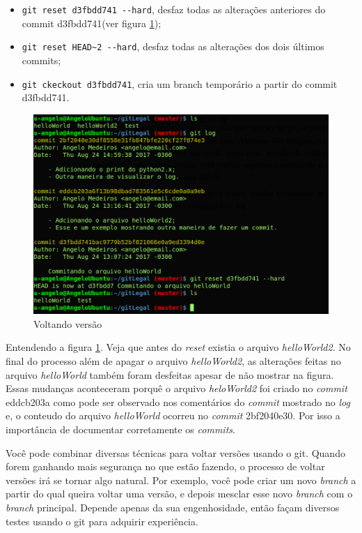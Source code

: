 \documentclass[12pt,openright,oneside,a4paper,english,brazil]{abntex2}
\begin{document}
\begin{itemize}
	\item \verb|git reset d3fbdd741 --hard|, desfaz todas as alterações anteriores do commit d3fbdd741(ver figura \ref{voltando});
	\item \verb|git reset HEAD~2 --hard|, desfaz todas as alterações dos dois últimos commits;
	\item \verb|git ckeckout d3fbdd741|, cria um branch temporário a partir do commit d3fbdd741.
\end{itemize}

\begin{figure}[h]
	\caption{\label{voltando}Voltando versão}
	\begin{center}
		\includegraphics[width=1\linewidth]{imagens/voltando}
	\end{center}
\end{figure}

Entendendo a figura \ref{voltando}. Veja que antes do \textit{reset} existia o arquivo \textit{helloWorld2}. No final do processo além de apagar o arquivo \textit{helloWorld2}, as alterações feitas no arquivo \textit{helloWorld} também foram desfeitas apesar de não mostrar na figura. Essas mudanças aconteceram porquê o arquivo \textit{heloWorld2} foi criado no \textit{commit} eddcb203a como pode ser observado nos comentários do \textit{commit} mostrado no \textit{log} e, o conteudo do arquivo \textit{helloWorld} ocorreu no \textit{commit} 2bf2040e30. Por isso a importância de documentar corretamente os \textit{commits}.

Você pode combinar diversas técnicas para voltar versões usando o git. Quando forem ganhando mais segurança no que estão fazendo, o processo de voltar versões irá se tornar algo natural. Por exemplo, você pode criar um novo \textit{branch} a partir do qual queira voltar uma versão, e depois mesclar esse novo \textit{branch} com o \textit{branch} principal. Depende apenas da sua engenhosidade, então façam diversos testes usando o git para adquirir experiência.
\end{document}
